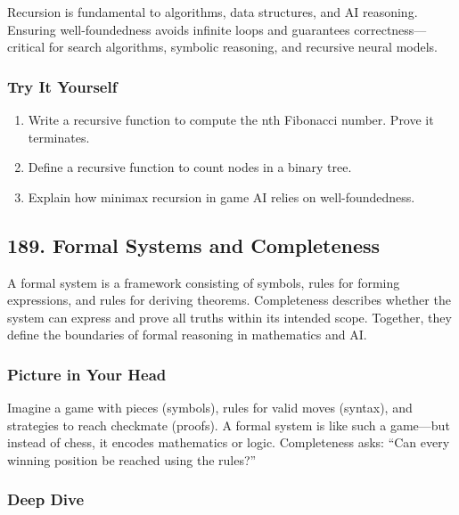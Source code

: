 \documentclass[
  letterpaper,
  DIV=11,
  numbers=noendperiod]{scrreprt}
\providecommand{\tightlist}{%
  \setlength{\itemsep}{0pt}\setlength{\parskip}{0pt}}
\begin{document}
Recursion is fundamental to algorithms, data structures, and AI
reasoning. Ensuring well-foundedness avoids infinite loops and
guarantees correctness---critical for search algorithms, symbolic
reasoning, and recursive neural models.

\subsubsection{Try It Yourself}\label{try-it-yourself-187}

\begin{enumerate}
\def\labelenumi{\arabic{enumi}.}
\tightlist
\item
  Write a recursive function to compute the nth Fibonacci number. Prove
  it terminates.
\item
  Define a recursive function to count nodes in a binary tree.
\item
  Explain how minimax recursion in game AI relies on well-foundedness.
\end{enumerate}

\subsection{189. Formal Systems and
Completeness}\label{formal-systems-and-completeness}

A formal system is a framework consisting of symbols, rules for forming
expressions, and rules for deriving theorems. Completeness describes
whether the system can express and prove all truths within its intended
scope. Together, they define the boundaries of formal reasoning in
mathematics and AI.

\subsubsection{Picture in Your Head}\label{picture-in-your-head-188}

Imagine a game with pieces (symbols), rules for valid moves (syntax),
and strategies to reach checkmate (proofs). A formal system is like such
a game---but instead of chess, it encodes mathematics or logic.
Completeness asks: ``Can every winning position be reached using the
rules?''

\subsubsection{Deep Dive}\label{deep-dive-188}
\end{document}
